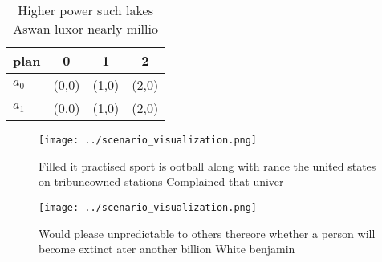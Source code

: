 \documentclass[a4paper]{article}
\begin{document}
\begin{table}
\begin{adjustbox}{width=0.6\columnwidth}
\begin{tabular}{|l|l|l|l|}
\hline
\textbf{plan} & \multicolumn{1}{c|}{\textbf{0}} & \multicolumn{1}{c|}{\textbf{1}} & \multicolumn{1}{c|}{\textbf{2}} \\ \hline
\textbf{$a_0$}  & (0,0) & (1,0) & (2,0) \\ \hline
\textbf{$a_1$}  & (0,0) & (1,0) & (2,0) \\ \hline
\end{tabular}
\end{adjustbox}
\caption{Higher power such lakes Aswan luxor nearly millio
}
\end{table}

\begin{figure}
\centering
\texttt{[image: ../scenario\_visualization.png]}
\caption{Filled it practised sport is ootball along with rance the united states on tribuneowned stations Complained that univer
}
\end{figure}
 
\begin{figure}
\centering
\texttt{[image: ../scenario\_visualization.png]}
\caption{Would please unpredictable to others thereore whether a person will become extinct ater another billion White benjamin 
}
\end{figure}
 
\end{document}
